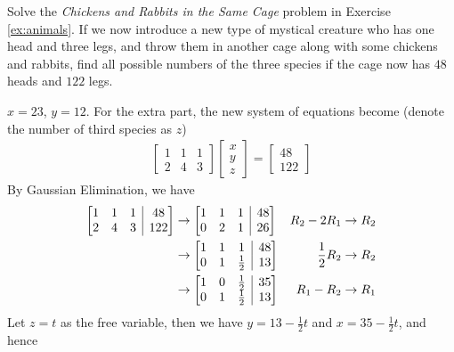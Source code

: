 \begin{Exercise}
Solve the \textit{Chickens and Rabbits in the Same Cage} problem in Exercise \ref{ex:animals}. If we now introduce a new type of mystical creature who has one head and three legs, and throw them in another cage along with some chickens and rabbits, find all possible numbers of the three species if the cage now has $48$ heads and $122$ legs.
\end{Exercise}
\begin{Answer}
$x = 23$, $y = 12$. For the extra part, the new system of equations become (denote the number of third species as $z$)
\begin{align*}
\begin{bmatrix}
1 & 1 & 1 \\
2 & 4 & 3
\end{bmatrix}
\begin{bmatrix}
x \\
y \\
z
\end{bmatrix}
=
\begin{bmatrix}
48 \\
122
\end{bmatrix}
\end{align*}
By Gaussian Elimination, we have
\begin{align*}
\left[
\begin{array}{@{}ccc|c@{}}
1 & 1 & 1 & 48 \\
2 & 4 & 3 & 122
\end{array}
\right]
&\to
\left[
\begin{array}{@{}ccc|c@{}}
1 & 1 & 1 & 48 \\
0 & 2 & 1 & 26
\end{array}
\right] & R_2 - 2R_1 \to R_2 \\
&\to
\left[
\begin{array}{@{}ccc|c@{}}
1 & 1 & 1 & 48 \\
0 & 1 & \frac{1}{2} & 13
\end{array}
\right] & \frac{1}{2}R_2 \to R_2 \\
&\to
\left[
\begin{array}{@{}ccc|c@{}}
1 & 0 & \frac{1}{2} & 35 \\
0 & 1 & \frac{1}{2} & 13
\end{array}
\right] & R_1 - R_2 \to R_1
\end{align*}
Let $z = t$ as the free variable, then we have $y = 13 - \frac{1}{2}t$ and $x = 35-\frac{1}{2}t$, and hence
\begin{align*}

\end{align*}
\end{Answer}
